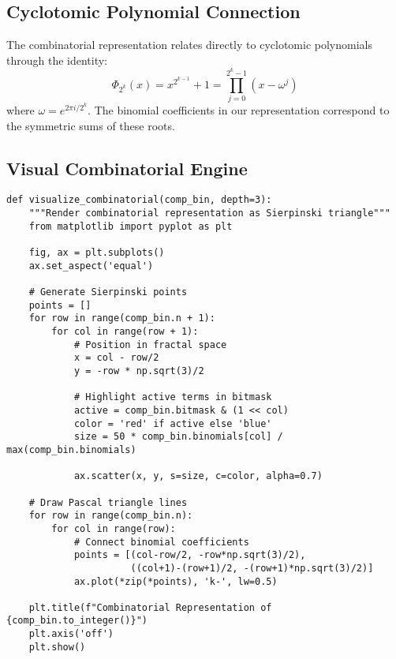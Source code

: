 \subsection{Cyclotomic Polynomial Connection}
The combinatorial representation relates directly to cyclotomic polynomials through the identity:
$$ \Phi_{2^k}(x) = x^{2^{k-1}} + 1 = \prod_{j=0}^{2^k-1} (x - \omega^j) $$
where $\omega = e^{2\pi i / 2^k}$. The binomial coefficients in our representation correspond to the symmetric sums of these roots.

\subsection{Visual Combinatorial Engine}
\begin{verbatim}
def visualize_combinatorial(comp_bin, depth=3):
    """Render combinatorial representation as Sierpinski triangle"""
    from matplotlib import pyplot as plt
    
    fig, ax = plt.subplots()
    ax.set_aspect('equal')
    
    # Generate Sierpinski points
    points = []
    for row in range(comp_bin.n + 1):
        for col in range(row + 1):
            # Position in fractal space
            x = col - row/2
            y = -row * np.sqrt(3)/2
            
            # Highlight active terms in bitmask
            active = comp_bin.bitmask & (1 << col)
            color = 'red' if active else 'blue'
            size = 50 * comp_bin.binomials[col] / max(comp_bin.binomials)
            
            ax.scatter(x, y, s=size, c=color, alpha=0.7)
    
    # Draw Pascal triangle lines
    for row in range(comp_bin.n):
        for col in range(row):
            # Connect binomial coefficients
            points = [(col-row/2, -row*np.sqrt(3)/2), 
                      ((col+1)-(row+1)/2, -(row+1)*np.sqrt(3)/2)]
            ax.plot(*zip(*points), 'k-', lw=0.5)
    
    plt.title(f"Combinatorial Representation of {comp_bin.to_integer()}")
    plt.axis('off')
    plt.show()
\end{verbatim}

